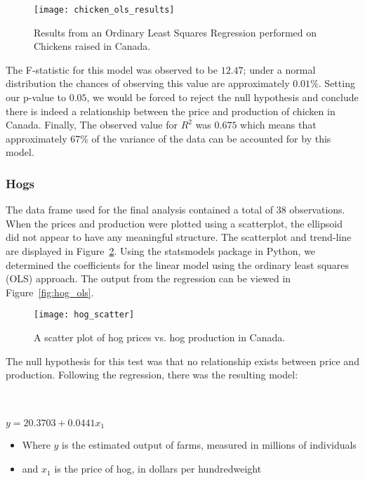 \begin{figure}
    \texttt{[image: chicken\_ols\_results]}
    \caption{Results from an Ordinary Least Squares Regression performed on Chickens raised in Canada.}
    \label{fig:chicken_ols}
\end{figure}

The F-statistic for this model was observed to be $12.47$; under a normal distribution the chances of observing this value are approximately $0.01\%$.
Setting our p-value to $0.05$, we would be forced to reject the null hypothesis and conclude there is indeed a relationship between the price and production of chicken in Canada.
Finally, The observed value for $R^2$ was $0.675$ which means that approximately 67\% of the variance of the data can be accounted for by this model.

\subsubsection{Hogs}

The data frame used for the final analysis contained a total of 38 observations.
When the prices and production were plotted using a scatterplot, the ellipsoid did not appear to have any meaningful structure.
The scatterplot and trend-line are displayed in Figure~\ref{fig:hog_scatter}.
Using the statsmodels package in Python, we determined the coefficients for the linear model using the ordinary least squares (OLS) approach.
The output from the regression can be viewed in Figure~\ref{fig:hog_ols}.

\begin{figure}
    \texttt{[image: hog\_scatter]}
    \caption{A scatter plot of hog prices vs. hog production in Canada.}
    \label{fig:hog_scatter}
\end{figure}

The null hypothesis for this test was that no relationship exists between price and production.
Following the regression, there was the resulting model:

\\~\\

\tabto{5cm} $y = 20.3703 + 0.0441x_1$

\begin{itemize}
    \item Where $y$ is the estimated output of farms, measured in millions of individuals
    \item and $x_1$ is the price of hog, in dollars per hundredweight
\end{itemize}

